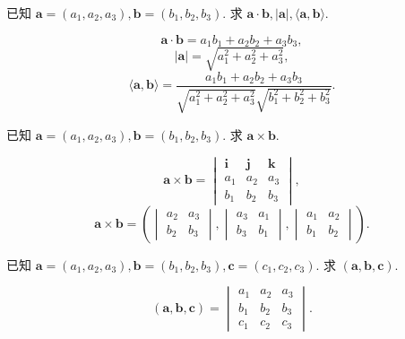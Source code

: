 \documentclass[cn,toc=twocol]{elegantbook}
\newcommand{\ve}[1]{\boldsymbol{#1}}
\newcommand{\vtimes}[2]{\ve{#1} \times \ve{#2}}
\begin{document}
\begin{example}
	已知 $\ve a = (a_1,a_2,a_3), \ve b = (b_1,b_2,b_3)$. 求 $\ve a \cdot \ve b, \lvert \ve a \rvert, \langle \ve a, \ve b \rangle$.
\end{example}

\begin{solution}
	\[
		\ve a \cdot \ve b = a_1 b_1 + a_2 b_2 + a_3 b_3,
	\]
	\[
		\lvert \ve a \rvert = \sqrt{a_1^2 + a_2^2 + a_3^2},
	\]
	\[
		\langle \ve a, \ve b\rangle = \frac{a_1 b_1 + a_2 b_2 + a_3 b_3}{\sqrt{a_1^2 + a_2^2 + a_3^2} \sqrt{b_1^2 + b_2^2 + b_3^2}}.
	\]
\end{solution}
\vspace{0.5em}

\begin{example}
	已知 $\ve a = (a_1,a_2,a_3), \ve b = (b_1,b_2,b_3)$. 求 $\vtimes{a}{b}$.
\end{example}

\begin{solution}
\[
	\vtimes{a}{b} = \begin{vmatrix}
		\ve i & \ve j & \ve k\\
		a_1 & a_2 & a_3\\
		b_1 & b_2 & b_3
	\end{vmatrix},
\]
\[
\vtimes{a}{b} = \left(\begin{vmatrix}
		a_2 & a_3\\
		b_2 & b_3
	\end{vmatrix}, \begin{vmatrix}
		a_3 & a_1\\
		b_3 & b_1
	\end{vmatrix}, \begin{vmatrix}
		a_1 & a_2\\
		b_1 & b_2
	\end{vmatrix}\right).
\]
\end{solution}
\vspace{0.5em}

\begin{example}
	已知 $\ve a = (a_1,a_2,a_3), \ve b = (b_1,b_2,b_3), \ve c = (c_1, c_2, c_3)$. 求 $(\ve a, \ve b, \ve c)$.
\end{example}

\begin{solution}
	\[
		(\ve a, \ve b, \ve c) = \begin{vmatrix}
			a_1 & a_2 & a_3\\
			b_1 & b_2 & b_3\\
			c_1 & c_2 & c_3
		\end{vmatrix}.
	\]
\end{solution}
\end{document}
